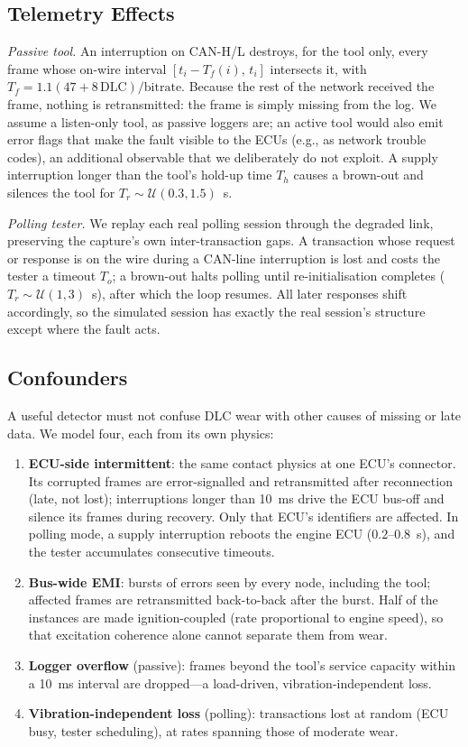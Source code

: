 \subsection{Telemetry Effects}
\emph{Passive tool.} An interruption on CAN-H/L destroys, for the tool
only, every frame whose on-wire interval $[t_i-T_f(i),\,t_i]$ intersects
it, with $T_f=1.1(47+8\,\mathrm{DLC})/\text{bitrate}$. Because the rest of
the network received the frame, nothing is retransmitted: the frame is
simply missing from the log. We assume a listen-only tool, as passive
loggers are; an active tool would also emit error flags that make the fault
visible to the ECUs (e.g., as network trouble codes), an additional
observable that we deliberately do not exploit. A supply interruption longer than the tool's
hold-up time $T_h$ causes a brown-out and silences the tool for
$T_r\sim\mathcal U(0.3,1.5)$~s.

\emph{Polling tester.} We replay each real polling session through the
degraded link, preserving the capture's own inter-transaction gaps. A
transaction whose request or response is on the wire during a CAN-line
interruption is lost and costs the tester a timeout $T_o$; a brown-out
halts polling until re-initialisation completes
($T_r\sim\mathcal U(1,3)$~s), after which the loop resumes. All later
responses shift accordingly, so the simulated session has exactly the
real session's structure except where the fault acts.

\subsection{Confounders}
A useful detector must not confuse DLC wear with other causes of missing
or late data. We model four, each from its own physics:
\begin{enumerate}
\item \textbf{ECU-side intermittent}: the same contact physics at one
  ECU's connector. Its corrupted frames are error-signalled and
  retransmitted after reconnection (late, not lost); interruptions longer
  than \SI{10}{\milli\second} drive the ECU bus-off and silence its
  frames during recovery. Only that ECU's identifiers are affected. In
  polling mode, a supply interruption reboots the engine ECU
  ($0.2$--$0.8$~s), and the tester accumulates consecutive timeouts.
\item \textbf{Bus-wide EMI}: bursts of errors seen by every node,
  including the tool; affected frames are retransmitted back-to-back after
  the burst. Half of the instances are made ignition-coupled (rate
  proportional to engine speed), so that excitation coherence alone cannot
  separate them from wear.
\item \textbf{Logger overflow} (passive): frames beyond the tool's service
  capacity within a \SI{10}{\milli\second} interval are dropped---a
  load-driven, vibration-independent loss.
\item \textbf{Vibration-independent loss} (polling): transactions lost at
  random (ECU busy, tester scheduling), at rates spanning those of
  moderate wear.
\end{enumerate}

